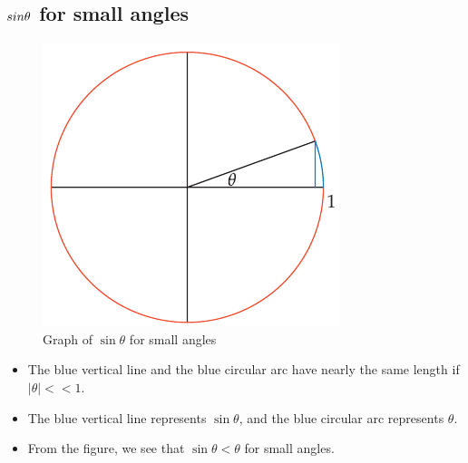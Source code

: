 \subsection{\(\\sin \theta\) for small angles}
\begin{figure}
    \centering
    \includegraphics[scale=0.4]{pics/30.png}
    \caption{Graph of $\sin \theta$ for small angles}
\end{figure}
\begin{itemize}
    \item The blue vertical line and the blue circular arc have nearly the same length if $|\theta| << 1$.
    \item The blue vertical line represents $\sin \theta$, and the blue circular arc represents $\theta$.
    \item From the figure, we see that $\sin \theta < \theta$ for small angles.
\end{itemize}

